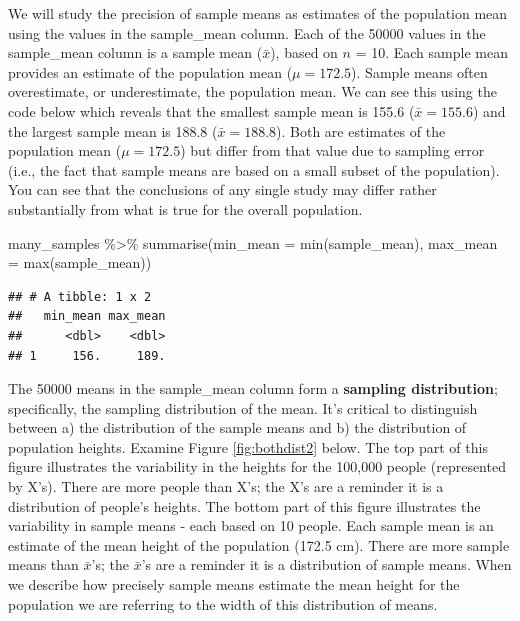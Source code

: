 \documentclass[
]{krantz}
\makeatletter
\newenvironment{Shaded}{\begin{snugshade}}{\end{snugshade}}
\newcommand{\AttributeTok}[1]{\textcolor[rgb]{0.61,0.61,0.61}{#1}}
\newcommand{\FunctionTok}[1]{\textcolor[rgb]{0,0,0}{#1}}
\newcommand{\NormalTok}[1]{#1}
\newcommand{\SpecialCharTok}[1]{\textcolor[rgb]{0,0,0}{#1}}
\newenvironment{kframe}{%
\medskip{}
\setlength{\fboxsep}{.8em}
 \def\at@end@of@kframe{}%
 \ifinner\ifhmode%
  \def\at@end@of@kframe{\end{minipage}}%
  \begin{minipage}{\columnwidth}%
 \fi\fi%
 \def\FrameCommand##1{\hskip\@totalleftmargin \hskip-\fboxsep
 \colorbox{shadecolor}{##1}\hskip-\fboxsep
     \hskip-\linewidth \hskip-\@totalleftmargin \hskip\columnwidth}%
 \MakeFramed {\advance\hsize-\width
   \@totalleftmargin\z@ \linewidth\hsize
   \@setminipage}}%
 {\par\unskip\endMakeFramed%
 \at@end@of@kframe}
\renewenvironment{Shaded}{\begin{kframe}}{\end{kframe}}
\makeatother
\begin{document}
We will study the precision of sample means as estimates of the population mean using the values in the sample\_mean column. Each of the 50000 values in the sample\_mean column is a sample mean (\(\bar{x}\)), based on \(n\) = 10. Each sample mean provides an estimate of the population mean (\(\mu = 172.5\)). Sample means often overestimate, or underestimate, the population mean. We can see this using the code below which reveals that the smallest sample mean is 155.6 (\(\bar{x} = 155.6\)) and the largest sample mean is 188.8 (\(\bar{x} = 188.8\)). Both are estimates of the population mean (\(\mu = 172.5\)) but differ from that value due to sampling error (i.e., the fact that sample means are based on a small subset of the population). You can see that the conclusions of any single study may differ rather substantially from what is true for the overall population.

\begin{Shaded}
\begin{Highlighting}[]
\NormalTok{many\_samples }\SpecialCharTok{\%\textgreater{}\%}
   \FunctionTok{summarise}\NormalTok{(}\AttributeTok{min\_mean =} \FunctionTok{min}\NormalTok{(sample\_mean),}
             \AttributeTok{max\_mean =} \FunctionTok{max}\NormalTok{(sample\_mean))}
\end{Highlighting}
\end{Shaded}

\begin{verbatim}
## # A tibble: 1 x 2
##   min_mean max_mean
##      <dbl>    <dbl>
## 1     156.     189.
\end{verbatim}

The 50000 means in the sample\_mean column form a \textbf{sampling distribution}; specifically, the sampling distribution of the mean. It's critical to distinguish between a) the distribution of the sample means and b) the distribution of population heights. Examine Figure \ref{fig:bothdist2} below. The top part of this figure illustrates the variability in the heights for the 100,000 people (represented by X's). There are more people than X's; the X's are a reminder it is a distribution of people's heights. The bottom part of this figure illustrates the variability in sample means - each based on 10 people. Each sample mean is an estimate of the mean height of the population (172.5 cm). There are more sample means than \(\bar{x}\)'s; the \(\bar{x}\)'s are a reminder it is a distribution of sample means. When we describe how precisely sample means estimate the mean height for the population we are referring to the width of this distribution of means.
\end{document}
